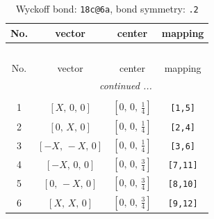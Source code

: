 \documentclass[fleqn,8pt]{jsarticle}
\begin{document}
\begin{longtable}{cccc}
\caption{Wyckoff bond: {\tt 18c@6a}, bond symmetry: {\tt .2}}
 \\
 \hline \hline
No. & vector & center & mapping \\ \hline \endfirsthead

\multicolumn{3}{l}{\tablename\ \thetable{}} \\
 \hline \hline
No. & vector & center & mapping \\ \hline \endhead

 \hline \hline
\multicolumn{3}{r}{\footnotesize\it continued ...} \\ \endfoot

 \hline \hline
\multicolumn{3}{r}{} \\ \endlastfoot

1 & $\left[ X,\, 0,\, 0 \right]$ & $\left[ 0,\, 0,\, \frac{1}{4} \right]$ & {\tt [1,5]} \\ \hline
2 & $\left[ 0,\, X,\, 0 \right]$ & $\left[ 0,\, 0,\, \frac{1}{4} \right]$ & {\tt [2,4]} \\ \hline
3 & $\left[ - X,\, - X,\, 0 \right]$ & $\left[ 0,\, 0,\, \frac{1}{4} \right]$ & {\tt [3,6]} \\ \hline
4 & $\left[ - X,\, 0,\, 0 \right]$ & $\left[ 0,\, 0,\, \frac{3}{4} \right]$ & {\tt [7,11]} \\ \hline
5 & $\left[ 0,\, - X,\, 0 \right]$ & $\left[ 0,\, 0,\, \frac{3}{4} \right]$ & {\tt [8,10]} \\ \hline
6 & $\left[ X,\, X,\, 0 \right]$ & $\left[ 0,\, 0,\, \frac{3}{4} \right]$ & {\tt [9,12]} \\
\end{longtable}
\renewcommand{\arraystretch}{1.2}
\end{document}
